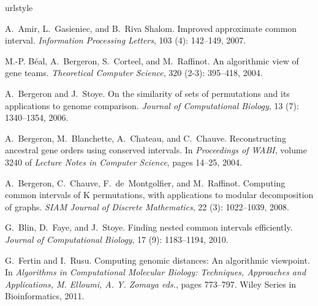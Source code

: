 \documentclass{article}
\begin{document}

\begin{thebibliography}{18}
\providecommand{\natexlab}[1]{#1}
\providecommand{\url}[1]{\texttt{#1}}
\expandafter\ifx\csname urlstyle\endcsname\relax
  \providecommand{\doi}[1]{doi: #1}\else
  \providecommand{\doi}{doi: \begingroup \urlstyle{rm}\Url}\fi

A.~Amir, L.~Gasieniec, and B.~Riva Shalom.
\newblock Improved approximate common interval.
\newblock \emph{Information Processing Letters}, 103 (4):
  142--149, 2007.

M.-P. B{\'e}al, A.~Bergeron, S.~Corteel, and M.~Raffinot.
\newblock An algorithmic view of gene teams.
\newblock \emph{Theoretical Computer Science}, 320 (2-3):
  395--418, 2004.

A.~Bergeron and J.~Stoye.
\newblock On the similarity of sets of permutations and its applications to
  genome comparison.
\newblock \emph{Journal of Computational Biology}, 13 (7):
  1340--1354, 2006.

A.~Bergeron, M.~Blanchette, A.~Chateau, and C.~Chauve.
\newblock Reconstructing ancestral gene orders using conserved intervals.
\newblock In \emph{Proceedings of WABI}, volume 3240 of \emph{Lecture Notes in
  Computer Science}, pages 14--25, 2004.

A.~Bergeron, C.~Chauve, F.~de~Montgolfier, and M.~Raffinot.
\newblock Computing common intervals of {K} permutations, with applications to
  modular decomposition of graphs.
\newblock \emph{SIAM Journal of Discrete Mathematics}, 22
  (3): 1022--1039, 2008.

G.~Blin, D.~Faye, and J.~Stoye.
\newblock Finding nested common intervals efficiently.
\newblock \emph{Journal of Computational Biology}, 17 (9):
  1183--1194, 2010.

G.~Fertin and I.~Rusu.
\newblock Computing genomic distances: An algorithmic viewpoint.
\newblock In \emph{Algorithms in Computational Molecular Biology: Techniques,
  Approaches and Applications, {\rm M. Elloumi, A. Y. Zomaya} {\it eds.}},
  pages 773--797. Wiley Series in Bioinformatics, 2011.


\end{thebibliography}
\end{document}
